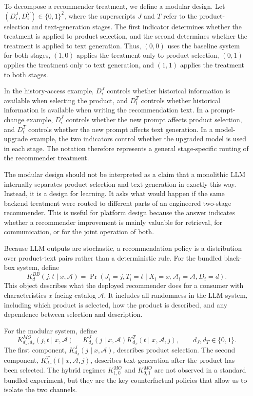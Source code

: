 \documentclass[11pt]{article}
\newcommand{\J}{J}
\newcommand{\catalog}{\mathcal{A}}
\begin{document}
To decompose a recommender treatment, we define a modular design. Let $(D_i^J,D_i^T) \in \{0,1\}^2$, where the superscripts $J$ and $T$ refer to the product-selection and text-generation stages. The first indicator determines whether the treatment is applied to product selection, and the second determines whether the treatment is applied to text generation. Thus, $(0,0)$ uses the baseline system for both stages, $(1,0)$ applies the treatment only to product selection, $(0,1)$ applies the treatment only to text generation, and $(1,1)$ applies the treatment to both stages.

In the history-access example, $D_i^J$ controls whether historical information is available when selecting the product, and $D_i^T$ controls whether historical information is available when writing the recommendation text. In a prompt-change example, $D_i^J$ controls whether the new prompt affects product selection, and $D_i^T$ controls whether the new prompt affects text generation. In a model-upgrade example, the two indicators control whether the upgraded model is used in each stage. The notation therefore represents a general stage-specific routing of the recommender treatment.

The modular design should not be interpreted as a claim that a monolithic LLM internally separates product selection and text generation in exactly this way. Instead, it is a design for learning. It asks what would happen if the same backend treatment were routed to different parts of an engineered two-stage recommender. This is useful for platform design because the answer indicates whether a recommender improvement is mainly valuable for retrieval, for communication, or for the joint operation of both.

Because LLM outputs are stochastic, a recommendation policy is a distribution over product-text pairs rather than a deterministic rule. For the bundled black-box system, define
\begin{equation}
K^{BB}_d(j,t \mid x,\catalog) = \Pr(\J_i = j, T_i = t \mid X_i = x, \catalog_i = \catalog, D_i = d).
\label{eq:kernel-blackbox}
\end{equation}
This object describes what the deployed recommender does for a consumer with characteristics $x$ facing catalog $\catalog$. It includes all randomness in the LLM system, including which product is selected, how the product is described, and any dependence between selection and description.

For the modular system, define
\begin{equation}
K^{MO}_{d_J,d_T}(j,t \mid x,\catalog) = K^J_{d_J}(j \mid x,\catalog) K^T_{d_T}(t \mid x,\catalog,j), \qquad d_J,d_T \in \{0,1\}.
\label{eq:kernel-modular}
\end{equation}
The first component, $K^J_{d_J}(j \mid x,\catalog)$, describes product selection. The second component, $K^T_{d_T}(t \mid x,\catalog,j)$, describes text generation after the product has been selected. The hybrid regimes $K^{MO}_{1,0}$ and $K^{MO}_{0,1}$ are not observed in a standard bundled experiment, but they are the key counterfactual policies that allow us to isolate the two channels.
\end{document}

